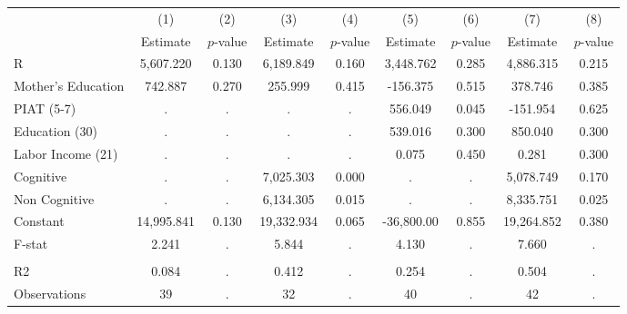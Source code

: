 \begin{tabular}{lcccccccc} \toprule
 & (1) & (2) & (3) & (4) & (5) & (6) & (7) & (8) \\ 
 & Estimate  & $p$-value  & Estimate  & $p$-value  & Estimate  & $p$-value  & Estimate  & $p$-value  \\  \midrule
R &  5,607.220 &     0.130 &  6,189.849 &     0.160 &  3,448.762 &     0.285 &  4,886.315 &     0.215 \\  
Mother's Education &   742.887 &     0.270 &   255.999 &     0.415 &  -156.375 &     0.515 &   378.746 &     0.385 \\  
PIAT (5-7) &         . &         . &         . &         . &   556.049 &     0.045 &  -151.954 &     0.625 \\  
Education (30) &         . &         . &         . &         . &   539.016 &     0.300 &   850.040 &     0.300 \\  
Labor Income (21) &         . &         . &         . &         . &     0.075 &     0.450 &     0.281 &     0.300 \\  
Cognitive &         . &         . &  7,025.303 &     0.000 &         . &         . &  5,078.749 &     0.170 \\  
Non Cognitive &         . &         . &  6,134.305 &     0.015 &         . &         . &  8,335.751 &     0.025 \\  
Constant & 14,995.841 &     0.130 & 19,332.934 &     0.065 & -36,800.00 &     0.855 & 19,264.852 &     0.380 \\  
F-stat &     2.241 &         . &     5.844 &         . &     4.130 &         . &     7.660 &         . \\  \\ \midrule
R2 &     0.084 &         . &     0.412 &         . &     0.254 &         . &     0.504 &         . \\  
Observations &    39 &         . &    32 &         . &    40 &         . &    42 &         . \\  
\bottomrule \end{tabular}
